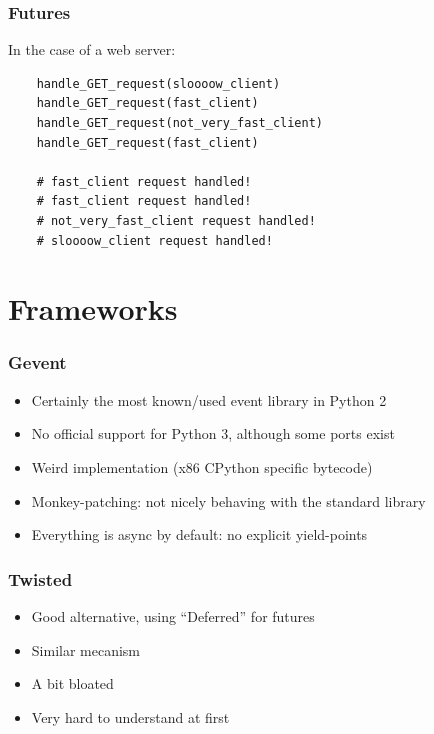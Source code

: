 \documentclass[ignorenonframetext,]{beamer}
\begin{document}
\begin{frame}[fragile]\frametitle{Futures}

In the case of a web server:

\begin{verbatim}
    handle_GET_request(sloooow_client)
    handle_GET_request(fast_client)
    handle_GET_request(not_very_fast_client)
    handle_GET_request(fast_client)

    # fast_client request handled!
    # fast_client request handled!
    # not_very_fast_client request handled!
    # sloooow_client request handled!
\end{verbatim}

\end{frame}

\section{Frameworks}

\begin{frame}[fragile]\frametitle{Gevent}

\begin{itemize}
\itemsep1pt\parskip0pt
\item
  Certainly the most known/used event library in Python 2
\item
  No official support for Python 3, although some ports exist
\item
  Weird implementation (x86 CPython specific bytecode)
\item
  Monkey-patching: not nicely behaving with the standard library
\item
  Everything is async by default: no explicit yield-points
\end{itemize}

\end{frame}

\begin{frame}[fragile]\frametitle{Twisted}

\begin{itemize}
\itemsep1pt\parskip0pt
\item
  Good alternative, using ``Deferred'' for futures
\item
  Similar mecanism
\item
  A bit bloated
\item
  Very hard to understand at first
\end{itemize}

\end{frame}
\end{document}
